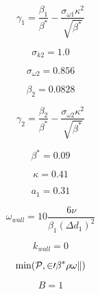 \begin{equation}
\gamma_1 = \frac{\beta_1}{\beta^*} - \frac{\sigma_{\omega 1} \kappa^2}{\sqrt{\beta^*}}
\end{equation}

\begin{equation}
\sigma_{k 2} = 1.0
\end{equation}

\begin{equation}
\sigma_{\omega 2} = 0.856
\end{equation}

\begin{equation}
\beta_2 = 0.0828
\end{equation}

\begin{equation}
\gamma_2 = \frac{\beta_2}{\beta^*} - \frac{\sigma_{\omega 2} \kappa^2}{\sqrt{\beta^*}}
\end{equation}

\begin{equation}
\beta^*=0.09
\end{equation}

\begin{equation}
\kappa=0.41
\end{equation}

\begin{equation}
a_1 = 0.31
\end{equation}

\begin{equation}
\omega_{wall} = 10 \frac{6 \nu}{\beta_1 (\Delta d_1)^2}
\end{equation}

\begin{equation}
k_{wall} = 0
\end{equation}

\begin{equation}
{\rm min}(\cal P, 20 \beta^* \rho \omega k)
\end{equation}

\begin{equation}
B=1
\end{equation}


